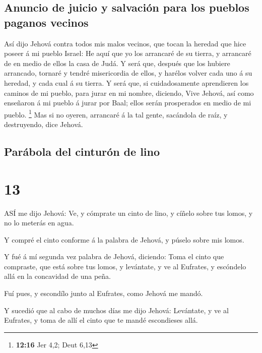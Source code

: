 \hypertarget{anuncio-de-juicio-y-salvaciuxf3n-para-los-pueblos-paganos-vecinos}{%
\subsection{Anuncio de juicio y salvación para los pueblos paganos
vecinos}\label{anuncio-de-juicio-y-salvaciuxf3n-para-los-pueblos-paganos-vecinos}}

 Así dijo Jehová contra todos mis malos vecinos, que tocan
la heredad que hice poseer á mi pueblo Israel: He aquí que yo los
arrancaré de su tierra, y arrancaré de en medio de ellos la casa de
Judá.  Y será que, después que los hubiere arrancado,
tornaré y tendré misericordia de ellos, y harélos volver cada uno á su
heredad, y cada cual á su tierra.  Y será que, si
cuidadosamente aprendieren los caminos de mi pueblo, para jurar en mi
nombre, diciendo, Vive Jehová, así como enseñaron á mi pueblo á jurar
por Baal; ellos serán prosperados en medio de mi pueblo. \footnote{\textbf{12:16}
  Jer 4,2; Deut 6,13}  Mas si no oyeren, arrancaré á la tal
gente, sacándola de raíz, y destruyendo, dice Jehová.

\hypertarget{paruxe1bola-del-cinturuxf3n-de-lino}{%
\subsection{Parábola del cinturón de
lino}\label{paruxe1bola-del-cinturuxf3n-de-lino}}

\hypertarget{section-12}{%
\section{13}\label{section-12}}

 ASÍ me dijo Jehová: Ve, y cómprate un cinto de lino, y
cíñelo sobre tus lomos, y no lo meterás en agua.

 Y compré el cinto conforme á la palabra de Jehová, y púselo
sobre mis lomos.

 Y fué á mí segunda vez palabra de Jehová, diciendo:
 Toma el cinto que compraste, que está sobre tus lomos, y
levántate, y ve al Eufrates, y escóndelo allá en la concavidad de una
peña.

 Fuí pues, y escondílo junto al Eufrates, como Jehová me
mandó.

 Y sucedió que al cabo de muchos días me dijo Jehová:
Levántate, y ve al Eufrates, y toma de allí el cinto que te mandé
escondieses allá.

